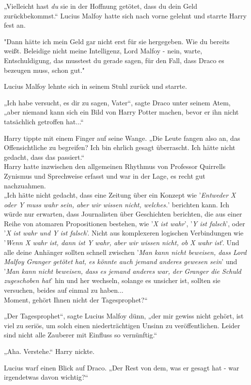 {„Vielleicht hast \emph{du} sie in der Hoffnung getötet, dass du dein Geld zurückbekommst.“ Lucius Malfoy hatte sich nach vorne gelehnt und starrte Harry fest an.

"Dann hätte ich mein Geld gar nicht erst für sie hergegeben. Wie du bereits weißt. Beleidige nicht meine Intelligenz, Lord Malfoy - nein, warte, Entschuldigung, das musstest du gerade sagen, für den Fall, dass Draco es bezeugen muss, schon gut."

Lucius Malfoy lehnte sich in seinem Stuhl zurück und starrte.

„Ich habe versucht, es dir zu sagen, Vater“, sagte Draco unter seinem Atem, „aber niemand kann sich ein Bild von Harry Potter machen, bevor er ihn nicht tatsächlich getroffen hat...“

Harry tippte mit einem Finger auf seine Wange. „Die Leute fangen also an, das Offensichtliche zu begreifen? Ich bin ehrlich gesagt überrascht. Ich hätte nicht gedacht, dass das passiert.“\\ Harry hatte inzwischen den allgemeinen Rhythmus von Professor Quirrells Zynismus und Sprechweise erfasst und war in der Lage, es recht gut nachzuahmen.\\ „Ich hätte nicht gedacht, dass eine Zeitung über ein Konzept wie '\emph{Entweder X oder Y muss wahr sein, aber wir wissen nicht, welches.}' berichten kann. Ich würde nur erwarten, dass Journalisten über Geschichten berichten, die aus einer Reihe von atomaren Propositionen bestehen, wie '\emph{X ist wahr}', '\emph{Y ist falsch}', oder '\emph{X ist wahr und Y ist falsch}'. Nicht aus komplexeren logischen Verbindungen wie '\emph{Wenn X wahr ist, dann ist Y wahr, aber wir wissen nicht, ob X wahr ist}'. Und alle deine Anhänger sollten schnell zwischen '\emph{Man kann nicht beweisen, dass Lord Malfoy Granger getötet hat, es könnte auch jemand anderes gewesen sein}' und '\emph{Man kann nicht beweisen, dass es jemand anderes war, der Granger die Schuld zugeschoben hat}' hin und her wechseln, solange es unsicher ist, sollten sie versuchen, beides auf einmal zu haben...\\ Moment, gehört Ihnen nicht der Tagesprophet?“

„Der Tagesprophet“, sagte Lucius Malfoy dünn, „der mir gewiss nicht gehört, ist viel zu seriös, um solch einen niederträchtigen Unsinn zu veröffentlichen. Leider sind nicht alle Zauberer mit Einfluss so vernünftig.“

„Aha. Verstehe.“ Harry nickte.

Lucius warf einen Blick auf Draco. „Der Rest von dem, was er gesagt hat - war irgendetwas davon wichtig?“

}
